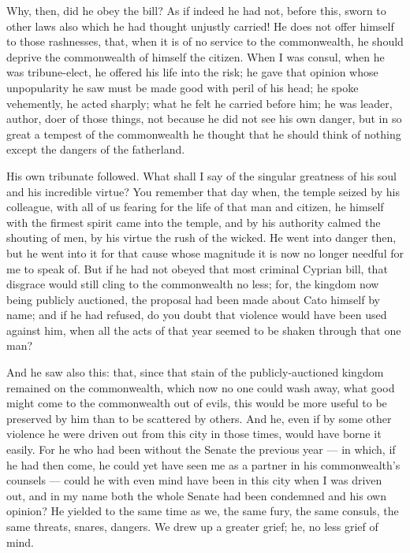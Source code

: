  Why, then, did he obey the bill? As if indeed he had not, before this, sworn to other laws also which he had thought unjustly carried! He does not offer himself to those rashnesses, that, when it is of no service to the commonwealth, he should deprive the commonwealth of himself the citizen. When I was consul, when he was tribune-elect, he offered his life into the risk; he gave that opinion whose unpopularity he saw must be made good with peril of his head; he spoke vehemently, he acted sharply; what he felt he carried before him; he was leader, author, doer of those things, not because he did not see his own danger, but in so great a tempest of the commonwealth he thought that he should think of nothing except the dangers of the fatherland.

 His own tribunate followed. What shall I say of the singular greatness of his soul and his incredible virtue? You remember that day when, the temple seized by his colleague, with all of us fearing for the life of that man and citizen, he himself with the firmest spirit came into the temple, and by his authority calmed the shouting of men, by his virtue the rush of the wicked. He went into danger then, but he went into it for that cause whose magnitude it is now no longer needful for me to speak of. But if he had not obeyed that most criminal Cyprian bill, that disgrace would still cling to the commonwealth no less; for, the kingdom now being publicly auctioned, the proposal had been made about Cato himself by name; and if he had refused, do you doubt that violence would have been used against him, when all the acts of that year seemed to be shaken through that one man?

 And he saw also this: that, since that stain of the publicly-auctioned kingdom remained on the commonwealth, which now no one could wash away, what good might come to the commonwealth out of evils, this would be more useful to be preserved by him than to be scattered by others. And he, even if by some other violence he were driven out from this city in those times, would have borne it easily. For he who had been without the Senate the previous year --- in which, if he had then come, he could yet have seen me as a partner in his commonwealth's counsels --- could he with even mind have been in this city when I was driven out, and in my name both the whole Senate had been condemned and his own opinion? He yielded to the same time as we, the same fury, the same consuls, the same threats, snares, dangers. We drew up a greater grief; he, no less grief of mind.

